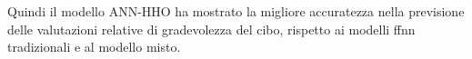 Quindi il modello ANN-HHO ha mostrato la migliore accuratezza nella previsione delle valutazioni relative di gradevolezza del cibo, rispetto ai modelli \gls{ffnn} tradizionali e al modello misto.

